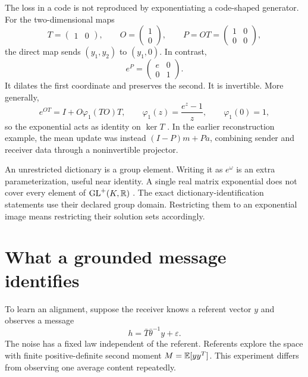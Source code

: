 The loss in a code is not reproduced by exponentiating a code-shaped generator. For the two-dimensional maps
\begin{equation}
T=\begin{pmatrix}1&0\end{pmatrix},\qquad
O=\begin{pmatrix}1\\0\end{pmatrix},\qquad
P=OT=\begin{pmatrix}1&0\\0&0\end{pmatrix},
\end{equation}
the direct map sends $(y_1,y_2)$ to $(y_1,0)$. In contrast,
\begin{equation}
e^P=\begin{pmatrix}e&0\\0&1\end{pmatrix}.
\label{c17:code-link-example}
\end{equation}
It dilates the first coordinate and preserves the second. It is invertible. More generally,
\begin{equation}
e^{OT}=I+O\varphi_1(TO)T,\qquad
\varphi_1(z)=\frac{e^z-1}{z},\qquad\varphi_1(0)=1,
\end{equation}
so the exponential acts as identity on $\ker T$ \citep{Higham2008}. In the earlier reconstruction example, the mean update was instead $(I-P)m+Pa$, combining sender and receiver data through a noninvertible projector.

An unrestricted dictionary is a group element. Writing it as $e^\omega$ is an extra parameterization, useful near identity. A single real matrix exponential does not cover every element of $\mathrm{GL}^+(K,\mathbb R)$ \citep{Culver1966}. The exact dictionary-identification statements use their declared group domain. Restricting them to an exponential image means restricting their solution sets accordingly.

\section{What a grounded message identifies}

To learn an alignment, suppose the receiver knows a referent vector $y$ and observes a message
\begin{equation}
h=\bar T\bar\theta^{-1}y+\varepsilon.
\label{c17:grounded}
\end{equation}
The noise has a fixed law independent of the referent. Referents explore the space with finite positive-definite second moment $M=\mathbb E[yy^T]$. This experiment differs from observing one average content repeatedly.

